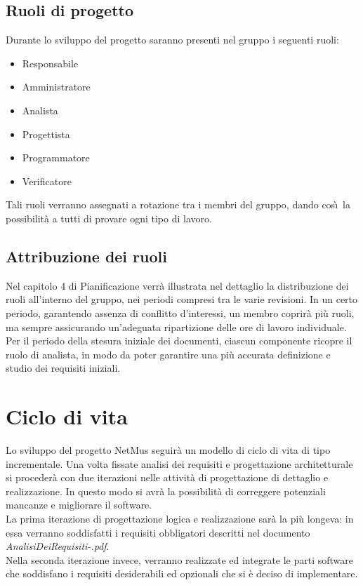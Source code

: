 \section{Ruoli di progetto}
Durante lo sviluppo del progetto saranno presenti nel gruppo i seguenti ruoli:
\begin{itemize}
  \item Responsabile
  \item Amministratore
  \item Analista
  \item Progettista
  \item Programmatore
  \item Verificatore
\end{itemize}

Tali ruoli verranno assegnati a rotazione tra i membri del gruppo, dando
cos\`\i\ la possibilit\`a a tutti di provare ogni tipo di lavoro.

\section{Attribuzione dei ruoli}
Nel capitolo 4 di Pianificazione verr\`a illustrata nel dettaglio la distribuzione dei ruoli
all'interno del gruppo, nei periodi compresi tra le varie revisioni.
In un certo periodo, garantendo assenza di conflitto d'interessi, un membro
coprir\`a pi\`u ruoli, ma sempre assicurando un'adeguata ripartizione delle ore
di lavoro individuale.\\

Per il periodo della stesura iniziale dei documenti, ciascun
componente ricopre il ruolo di analista, in modo da poter garantire una pi\`u
accurata definizione e studio dei requisiti iniziali.

\chapter{Ciclo di vita}
\thispagestyle{fancy}
Lo sviluppo del progetto NetMus seguir\`a un modello di ciclo di vita
di tipo incrementale. Una volta fissate analisi dei
requisiti e progettazione architetturale si proceder\`a con due iterazioni nelle
attivit\`a di progettazione di dettaglio e realizzazione. In questo modo si
avr\`a la possibilit\`a di correggere potenziali mancanze e migliorare il
software.\\
La prima iterazione di progettazione logica e realizzazione sar\`a la pi\`u
longeva: in essa verranno soddisfatti i requisiti obbligatori descritti nel
documento \emph{AnalisiDeiRequisiti-\versioneAR.pdf}.\\
Nella seconda iterazione invece, verranno realizzate ed integrate le parti
software che soddisfano i requisiti desiderabili ed opzionali che si \`e deciso
di implementare.\\

